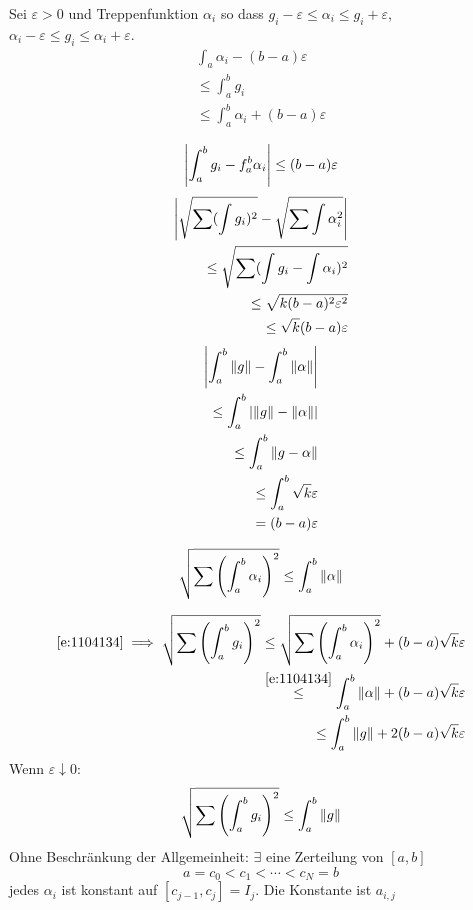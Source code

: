 \begin{Bew}
  Sei $\varepsilon>0$ und Treppenfunktion $\alpha_i$ so dass $g_i-\varepsilon\leq\alpha_i\leq g_i+\varepsilon$, $\alpha_i-\varepsilon\leq g_i\leq \alpha_i+\varepsilon$.
  \begin{eqnarray*}
    \int_a\alpha_i-(b-a)\varepsilon\\
    \leq\int_a^b g_i\\
    \leq \int_a^b\alpha_i+(b-a)\varepsilon\\
  \end{eqnarray*}
  \[\left| \int_a^bg_i-f_a^b\alpha_i \right|\leq (b-a)\varepsilon\]
  \begin{eqnarray*}
    \left| \sqrt{\sum(\int g_i)^2}-\sqrt{\sum\int\alpha_i^2} \right|\\
    \leq\sqrt{\sum(\int g_i-\int \alpha_i)^2}\\
    \leq\sqrt{k(b-a)^2\varepsilon^2}\\
    \leq \sqrt{k}(b-a)\varepsilon
  \end{eqnarray*}
  \begin{eqnarray*}
    \left| \int_a^b\left\| g \right\|-\int_a^b\left\| \alpha \right\| \right|\\
    \leq\int_a^b\left| \left\| g \right\|-\left\| \alpha \right\| \right|\\
    \leq\int_a^b\left\| g-\alpha \right\|\\
    \leq\int_a^b\sqrt{k}\varepsilon\\
    =(b-a)\varepsilon
  \end{eqnarray*}
  \begin{Beh}
    \begin{equation}
      \label{e:1104134}
      \sqrt{\sum\left(\int_a^b\alpha_i\right)^2}\leq\int_a^b\left\| \alpha \right\|
    \end{equation}
  \end{Beh}
  \begin{eqnarray*}
    \ref{e:1104134}\implies
    \sqrt{\sum\left(\int_a^b g_i\right)^2}\leq\sqrt{\sum\left(\int_a^b\alpha_i\right)^2}+(b-a)\sqrt{k}\varepsilon \\
    \stackrel{\ref{e:1104134}}{\leq}\int_a^b\left\| \alpha \right\|+(b-a)\sqrt{k}\varepsilon\\
    \leq\int_a^b\left\| g \right\|+2(b-a)\sqrt{k}\varepsilon
  \end{eqnarray*}
  Wenn $\varepsilon\downarrow 0$:
  \[\sqrt{\sum\left( \int_a^bg_i \right)^2}\leq\int_a^b\left\| g \right\|\]
  Ohne Beschränkung der Allgemeinheit: $\exists$ eine Zerteilung von $[a,b]$ 
  \[a=c_0<c_1<\cdots<c_N=b\]
  jedes $\alpha_i$ ist konstant auf $[c_{j-1},c_j]=I_j$. Die Konstante ist $a_{i,j}$

\end{Bew}
